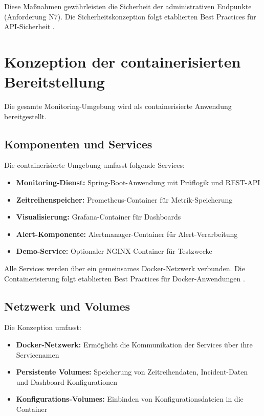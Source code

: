 Diese Maßnahmen gewährleisten die Sicherheit der administrativen Endpunkte (Anforderung N7). Die Sicherheitskonzeption folgt etablierten Best Practices für API-Sicherheit \cite{api-security-best-practices}.

\section{Konzeption der containerisierten Bereitstellung}
\label{sec:konzeption-containerisierung}

Die gesamte Monitoring-Umgebung wird als containerisierte Anwendung bereitgestellt.

\subsection{Komponenten und Services}
\label{subsec:komponenten-services}

Die containerisierte Umgebung umfasst folgende Services:

\begin{itemize}
    \item \textbf{Monitoring-Dienst:} Spring-Boot-Anwendung mit Prüflogik und REST-API
    \item \textbf{Zeitreihenspeicher:} Prometheus-Container für Metrik-Speicherung
    \item \textbf{Visualisierung:} Grafana-Container für Dashboards
    \item \textbf{Alert-Komponente:} Alertmanager-Container für Alert-Verarbeitung
    \item \textbf{Demo-Service:} Optionaler NGINX-Container für Testzwecke
\end{itemize}

Alle Services werden über ein gemeinsames Docker-Netzwerk verbunden. Die Containerisierung folgt etablierten Best Practices für Docker-Anwendungen \cite{docker-best-practices}.

\subsection{Netzwerk und Volumes}
\label{subsec:netzwerk-volumes}

Die Konzeption umfasst:

\begin{itemize}
    \item \textbf{Docker-Netzwerk:} Ermöglicht die Kommunikation der Services über ihre Servicenamen
    \item \textbf{Persistente Volumes:} Speicherung von Zeitreihendaten, Incident-Daten und Dashboard-Konfigurationen
    \item \textbf{Konfigurations-Volumes:} Einbinden von Konfigurationsdateien in die Container
\end{itemize}

